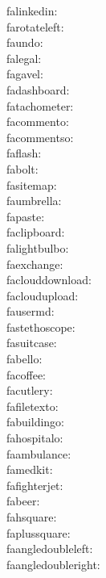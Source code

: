 falinkedin: {\FA \falinkedin} \\
farotateleft: {\FA \farotateleft} \\
faundo: {\FA \faundo} \\
falegal: {\FA \falegal} \\
fagavel: {\FA \fagavel} \\
fadashboard: {\FA \fadashboard} \\
fatachometer: {\FA \fatachometer} \\
facommento: {\FA \facommento} \\
facommentso: {\FA \facommentso} \\
faflash: {\FA \faflash} \\
fabolt: {\FA \fabolt} \\
fasitemap: {\FA \fasitemap} \\
faumbrella: {\FA \faumbrella} \\
fapaste: {\FA \fapaste} \\
faclipboard: {\FA \faclipboard} \\
falightbulbo: {\FA \falightbulbo} \\
faexchange: {\FA \faexchange} \\
faclouddownload: {\FA \faclouddownload} \\
facloudupload: {\FA \facloudupload} \\
fausermd: {\FA \fausermd} \\
fastethoscope: {\FA \fastethoscope} \\
fasuitcase: {\FA \fasuitcase} \\
fabello: {\FA \fabello} \\
facoffee: {\FA \facoffee} \\
facutlery: {\FA \facutlery} \\
fafiletexto: {\FA \fafiletexto} \\
fabuildingo: {\FA \fabuildingo} \\
fahospitalo: {\FA \fahospitalo} \\
faambulance: {\FA \faambulance} \\
famedkit: {\FA \famedkit} \\
fafighterjet: {\FA \fafighterjet} \\
fabeer: {\FA \fabeer} \\
fahsquare: {\FA \fahsquare} \\
faplussquare: {\FA \faplussquare} \\
faangledoubleleft: {\FA \faangledoubleleft} \\
faangledoubleright: {\FA \faangledoubleright} \\
